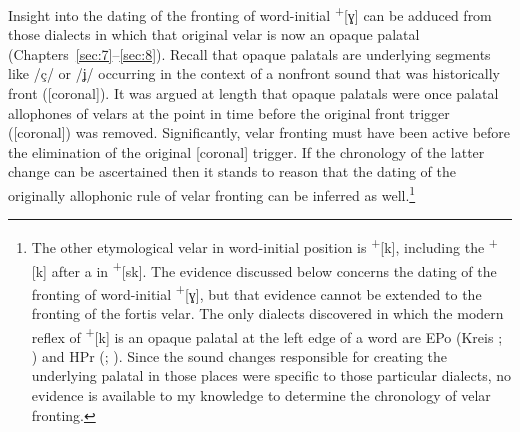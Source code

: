 Insight into the dating of the fronting of word-initial  \textsuperscript{+}[ɣ] can be adduced from those dialects in which that original velar is now an opaque palatal (Chapters~\ref{sec:7}--\ref{sec:8}). Recall that opaque palatals are underlying segments like /ç/ or /ʝ/ occurring in the context of a nonfront sound that was historically front ([coronal]). It was argued at length that opaque palatals were once palatal allophones of velars at the point in time before the original front trigger ([coronal]) was removed. Significantly, velar fronting must have been active before the elimination of the original [coronal] trigger. If the chronology of the latter change can be ascertained then it stands to reason that the dating of the originally allophonic rule of velar fronting can be inferred as well.\footnote{{The other etymological velar in word-initial position is } \textrm{\textsuperscript{+}}\textrm{[k], including the} \textrm{\textsuperscript{+}}\textrm{[k] after a  in } \textrm{\textsuperscript{+}}\textrm{[sk]. The evidence discussed below concerns the dating of the fronting of word-initial} \textrm{\textsuperscript{+}}\textrm{[ɣ], but that evidence cannot be extended to the fronting of the fortis velar. The only dialects discovered in which the modern reflex of } \textrm{\textsuperscript{+}}\textrm{[k] is an opaque palatal at the left edge of a word are EPo (Kreis ; ) and HPr (; ). Since the sound changes responsible for creating the underlying palatal in those places were specific to those particular dialects, no evidence is available to my knowledge to determine the chronology of velar fronting.}}

